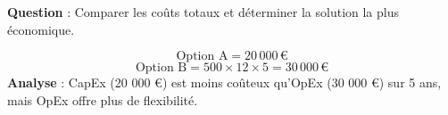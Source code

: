 \documentclass[12pt,a4paper]{report}
\begin{document}
\textbf{Question} : Comparer les coûts totaux et déterminer la solution la plus économique.

\begin{tcolorbox}[title={Correction}]
\[
\text{Option A} = 20\,000 \,€
\]
\[
\text{Option B} = 500 \times 12 \times 5 = 30\,000 \,€
\]
\textbf{Analyse} :  
CapEx (20 000 €) est moins coûteux qu’OpEx (30 000 €) sur 5 ans, mais OpEx offre plus de flexibilité.
\end{tcolorbox}
\end{document}
